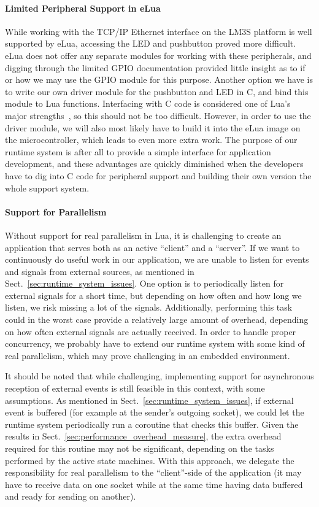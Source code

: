 \paragraph{Limited Peripheral Support in eLua} While working with the TCP/IP Ethernet interface on the LM3S platform is well supported by eLua, accessing the LED and pushbutton proved more difficult. eLua does not offer any separate modules for working with these peripherals, and digging through the limited GPIO documentation provided little insight as to if or how we may use the GPIO module for this purpose. Another option we have is to write our own driver module for the pushbutton and LED in C, and bind this module to Lua functions. Interfacing with C code is considered one of Lua's major strengths~\cite{inproceedings:the_evolution_of_lua}, so this should not be too difficult. However, in order to use the driver module, we will also most likely have to build it into the eLua image on the microcontroller, which leads to even more extra work. The purpose of our runtime system is after all to provide a simple interface for application development, and these advantages are quickly diminished when the developers have to dig into C code for peripheral support and building their own version the whole support system.

\paragraph{Support for Parallelism} Without support for real parallelism in Lua, it is challenging to create an application that serves both as an active ``client'' and a ``server''. If we want to continuously do useful work in our application, we are unable to listen for events and signals from external sources, as mentioned in Sect.~\ref{sec:runtime_system_issues}. One option is to periodically listen for external signals for a short time, but depending on how often and how long we listen, we risk missing a lot of the signals. Additionally, performing this task could in the worst case provide a relatively large amount of overhead, depending on how often external signals are actually received. In order to handle proper concurrency, we probably have to extend our runtime system with some kind of real parallelism, which may prove challenging in an embedded environment.

It should be noted that while challenging, implementing support for asynchronous reception of external events is still feasible in this context, with some assumptions. As mentioned in Sect.~\ref{sec:runtime_system_issues}, if external event is buffered (for example at the sender's outgoing socket), we could let the runtime system periodically run a coroutine that checks this buffer. Given the results in Sect.~\ref{sec:performance_overhead_measure}, the extra overhead required for this routine may not be significant, depending on the tasks performed by the active state machines. With this approach, we delegate the responsibility for real parallelism to the ``client''-side of the application (it may have to receive data on one socket while at the same time having data buffered and ready for sending on another).

